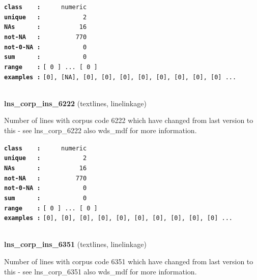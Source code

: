 \documentclass[]{article}
\begin{document}
\textbf{\texttt{class\ \ \ \ :}} \texttt{~~~~~numeric}\\
\textbf{\texttt{unique\ \ \ :}} \texttt{~~~~~~~~~~~2}\\
\textbf{\texttt{NAs\ \ \ \ \ \ :}} \texttt{~~~~~~~~~~16}\\
\textbf{\texttt{not-NA\ \ \ :}} \texttt{~~~~~~~~~770}\\
\textbf{\texttt{not-0-NA\ :}} \texttt{~~~~~~~~~~~0}\\
\textbf{\texttt{sum\ \ \ \ \ \ :}} \texttt{~~~~~~~~~~~0}\\
\textbf{\texttt{range\ \ \ \ :}}
\texttt{{[}\ 0\ {]}\ ...\ {[}\ 0\ {]}}\\
\textbf{\texttt{examples\ :}}
\texttt{{[}0{]},\ {[}NA{]},\ {[}0{]},\ {[}0{]},\ {[}0{]},\ {[}0{]},\ {[}0{]},\ {[}0{]},\ {[}0{]},\ {[}0{]}\ ...}\\

~

\textbf{lns\_corp\_ins\_6222} (textlines, linelinkage)

Number of lines with corpus code 6222 which have changed from last
version to this - see lns\_corp\_6222 also wds\_mdf for more
information.

\textbf{\texttt{class\ \ \ \ :}} \texttt{~~~~~numeric}\\
\textbf{\texttt{unique\ \ \ :}} \texttt{~~~~~~~~~~~2}\\
\textbf{\texttt{NAs\ \ \ \ \ \ :}} \texttt{~~~~~~~~~~16}\\
\textbf{\texttt{not-NA\ \ \ :}} \texttt{~~~~~~~~~770}\\
\textbf{\texttt{not-0-NA\ :}} \texttt{~~~~~~~~~~~0}\\
\textbf{\texttt{sum\ \ \ \ \ \ :}} \texttt{~~~~~~~~~~~0}\\
\textbf{\texttt{range\ \ \ \ :}}
\texttt{{[}\ 0\ {]}\ ...\ {[}\ 0\ {]}}\\
\textbf{\texttt{examples\ :}}
\texttt{{[}0{]},\ {[}0{]},\ {[}0{]},\ {[}0{]},\ {[}0{]},\ {[}0{]},\ {[}0{]},\ {[}0{]},\ {[}0{]},\ {[}0{]}\ ...}\\

~

\textbf{lns\_corp\_ins\_6351} (textlines, linelinkage)

Number of lines with corpus code 6351 which have changed from last
version to this - see lns\_corp\_6351 also wds\_mdf for more
information.
\end{document}
